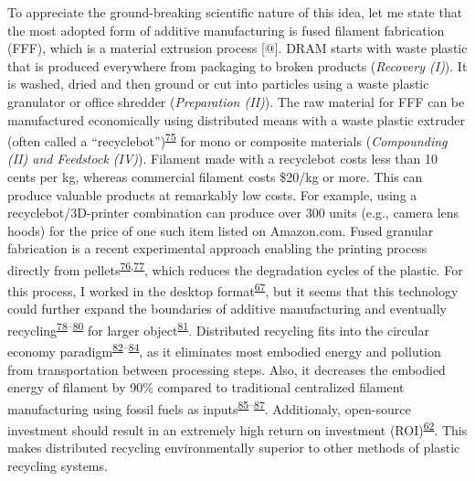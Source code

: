 \documentclass[
  11pt,
  a4paperpaper,
  onecolumn]{article}
\begin{document}
To appreciate the ground-breaking scientific nature of this idea, let me
state that the most adopted form of additive manufacturing is fused
filament fabrication (FFF), which is a material extrusion process
{[}@{]}. DRAM starts with waste plastic that is produced everywhere from
packaging to broken products (\emph{Recovery (I)}). It is washed, dried
and then ground or cut into particles using a waste plastic granulator
or office shredder (\emph{Preparation (II)}). The raw material for FFF
can be manufactured economically using distributed means with a waste
plastic extruder (often called a
``recyclebot'')\textsuperscript{\protect\hyperlink{ref-Baechler2013}{75}}
for mono or composite materials (\emph{Compounding (II) and Feedstock
(IV)}). Filament made with a recyclebot costs less than 10 cents per kg,
whereas commercial filament costs \$20/kg or more. This can produce
valuable products at remarkably low costs. For example, using a
recyclebot/3D-printer combination can produce over 300 units (e.g.,
camera lens hoods) for the price of one such item listed on Amazon.com.
Fused granular fabrication is a recent experimental approach enabling
the printing process directly from
pellets\textsuperscript{\protect\hyperlink{ref-JustinoNetto2021}{76},\protect\hyperlink{ref-netto2022}{77}},
which reduces the degradation cycles of the plastic. For this process, I
worked in the desktop
format\textsuperscript{\protect\hyperlink{ref-Arthur2020}{67}}, but it
seems that this technology could further expand the boundaries of
additive manufacturing and eventually
recycling\textsuperscript{\protect\hyperlink{ref-billah2021}{78}--\protect\hyperlink{ref-Byard2019}{80}}
for larger
object\textsuperscript{\protect\hyperlink{ref-petsiuk2022}{81}}.
Distributed recycling fits into the circular economy
paradigm\textsuperscript{\protect\hyperlink{ref-Zhong2018}{82}--\protect\hyperlink{ref-Despeisse2016}{84}},
as it eliminates most embodied energy and pollution from transportation
between processing steps. Also, it decreases the embodied energy of
filament by 90\% compared to traditional centralized filament
manufacturing using fossil fuels as
inputs\textsuperscript{\protect\hyperlink{ref-Kreiger2013}{85}--\protect\hyperlink{ref-Horta2017}{87}}.
Additionaly, open-source investment should result in an extremely high
return on investment
(ROI)\textsuperscript{\protect\hyperlink{ref-Pearce2020a}{62}}. This
makes distributed recycling environmentally superior to other methods of
plastic recycling systems.
\end{document}
